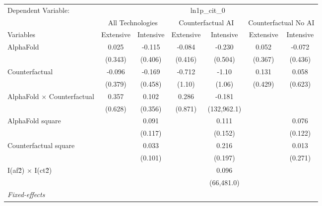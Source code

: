 \begingroup
\centering
\begin{tabular}{lcccccc}
   \tabularnewline \midrule \midrule
   Dependent Variable: & \multicolumn{6}{c}{ln1p\_cit\_0}\\
 & \multicolumn{2}{c}{All Technologies} & \multicolumn{2}{c}{Counterfactual AI} & \multicolumn{2}{c}{Counterfactual No AI} \\
\cmidrule(lr){1-1}\cmidrule(lr){2-3} \cmidrule(lr){4-5} \cmidrule(lr){6-7}
Variables & \multicolumn{1}{c}{Extensive} & \multicolumn{1}{c}{Intensive} & \multicolumn{1}{c}{Extensive} & \multicolumn{1}{c}{Intensive} & \multicolumn{1}{c}{Extensive} & \multicolumn{1}{c}{Intensive} \\
\cmidrule(lr){1-1}\cmidrule(lr){2-2} \cmidrule(lr){3-3} \cmidrule(lr){4-4} \cmidrule(lr){5-5} \cmidrule(lr){6-6} \cmidrule(lr){7-7}
   AlphaFold                          & 0.025   & -0.115  & -0.084  & -0.230      & 0.052   & -0.072\\   
                                      & (0.343) & (0.406) & (0.416) & (0.504)     & (0.367) & (0.436)\\   
   Counterfactual                     & -0.096  & -0.169  & -0.712  & -1.10       & 0.131   & 0.058\\   
                                      & (0.379) & (0.458) & (1.10)  & (1.06)      & (0.429) & (0.623)\\   
   AlphaFold $\times$ Counterfactual  & 0.357   & 0.102   & 0.286   & -0.181      &         &   \\   
                                      & (0.628) & (0.356) & (0.871) & (132,962.1) &         &   \\   
   AlphaFold square                   &         & 0.091   &         & 0.111       &         & 0.076\\   
                                      &         & (0.117) &         & (0.152)     &         & (0.122)\\   
   Counterfactual square              &         & 0.033   &         & 0.216       &         & 0.013\\   
                                      &         & (0.101) &         & (0.197)     &         & (0.271)\\   
   I(af\^2) $\times$ I(ct\^2)         &         &         &         & 0.096       &         &   \\   
                                      &         &         &         & (66,481.0)  &         &   \\   
   \midrule
   \emph{Fixed-effects}\\

\end{tabular}
